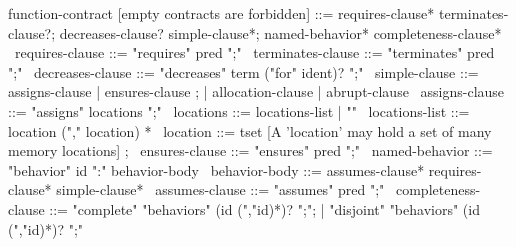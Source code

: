 \begin{syntax}
  function-contract [empty contracts are forbidden] ::= requires-clause* terminates-clause?;
                        decreases-clause? simple-clause*;
                        named-behavior* completeness-clause*
  \
  requires-clause ::= "requires" pred ";"
  \
  terminates-clause ::= "terminates" pred ";"
  \
  decreases-clause ::= "decreases" term ("for" ident)? ";"
  \
  simple-clause ::= assigns-clause | ensures-clause ;
                | allocation-clause | abrupt-clause 
  \
  assigns-clause ::= "assigns" locations ";"
  \
  locations ::= locations-list | "\nothing"
  \
  locations-list ::= location ("," location) *
  \
  location ::= tset [A 'location' may hold a set of many memory locations] ;
  \
  ensures-clause ::= "ensures" pred ";"
  \
  named-behavior ::= "behavior" id ":" behavior-body
  \
  behavior-body ::= assumes-clause* requires-clause* simple-clause* 
  \
  assumes-clause ::= "assumes" pred ";"
  \
  completeness-clause ::= "complete" "behaviors" (id (","id)*)? ";";
     | "disjoint" "behaviors" (id (","id)*)? ";"
\end{syntax}
